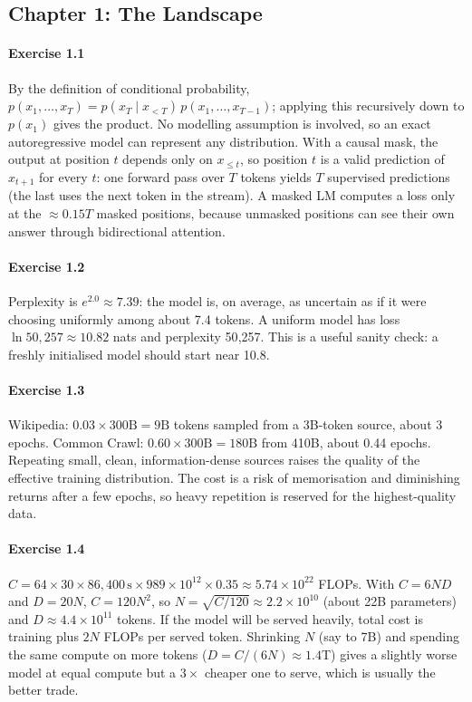 \subsection*{Chapter 1: The Landscape}

\paragraph{Exercise 1.1}
By the definition of conditional probability, $p(x_1,\dots,x_T)=p(x_T\mid x_{<T})\,p(x_1,\dots,x_{T-1})$; applying
this recursively down to $p(x_1)$ gives the product. No modelling assumption is involved, so an exact
autoregressive model can represent any distribution. With a causal mask, the output at position $t$ depends
only on $x_{\le t}$, so position $t$ is a valid prediction of $x_{t+1}$ for every $t$: one forward pass over
$T$ tokens yields $T$ supervised predictions (the last uses the next token in the stream). A masked LM
computes a loss only at the $\approx0.15T$ masked positions, because unmasked positions can see their own
answer through bidirectional attention.

\paragraph{Exercise 1.2}
Perplexity is $e^{2.0}\approx7.39$: the model is, on average, as uncertain as if it were choosing uniformly
among about 7.4 tokens. A uniform model has loss $\ln 50{,}257\approx10.82$ nats and perplexity 50{,}257.
This is a useful sanity check: a freshly initialised model should start near 10.8.

\paragraph{Exercise 1.3}
Wikipedia: $0.03\times300\text{B}=9\text{B}$ tokens sampled from a 3B-token source, about 3 epochs.
Common Crawl: $0.60\times300\text{B}=180\text{B}$ from 410B, about 0.44 epochs. Repeating small, clean,
information-dense sources raises the quality of the effective training distribution. The cost is a risk of
memorisation and diminishing returns after a few epochs, so heavy repetition is reserved for the
highest-quality data.

\paragraph{Exercise 1.4}
$C=64\times30\times86{,}400\,\text{s}\times989\times10^{12}\times0.35\approx5.74\times10^{22}$ FLOPs. With
$C=6ND$ and $D=20N$, $C=120N^2$, so $N=\sqrt{C/120}\approx2.2\times10^{10}$ (about 22B parameters) and
$D\approx4.4\times10^{11}$ tokens. If the model will be served heavily, total cost is training plus
$2N$ FLOPs per served token. Shrinking $N$ (say to 7B) and spending the same compute on more tokens
($D=C/(6N)\approx1.4$T) gives a slightly worse model at equal compute but a $3\times$ cheaper one to serve, which
is usually the better trade.

